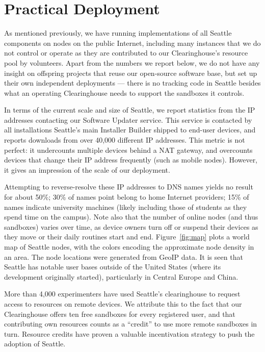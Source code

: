 \section{Practical Deployment}\label{sec-deployment}

As mentioned previously, we have running implementations of all
Seattle components on nodes on the public Internet, including
many instances that we do not control or operate as they are
contributed to our Clearinghouse's resource pool by volunteers.
Apart from the numbers we report below, we do not have any
insight on offspring projects that reuse our open-source software
base, but set up their own independent deployments --- there is
no tracking code in Seattle besides what an operating Clearinghouse
needs to support the sandboxes it controls.

In terms of the current scale and size of Seattle, we report
statistics from the \gls{IP} addresses contacting our Software
Updater service. This service is contacted
by all installations Seattle's main Installer Builder shipped
to end-user devices, and reports downloads from over 40,000
different \gls{IP} addresses.
This metric is not perfect: it undercounts multiple devices behind
a \gls{NAT} gateway, and overcounts devices that change their
\gls{IP} address frequently (such as mobile nodes). However, it
gives an impression of the scale of our deployment.

Attempting to reverse-resolve these \gls{IP} addresses to \gls{DNS}
names yields no result for about 50\%; 30\% of names point belong
to home Internet providers; 15\% of names indicate
university machines (likely including those of students as they
spend time on the campus). Note also that the number of online
nodes (and thus sandboxes) varies over time, as device owners
turn off or suspend their devices as they move or their daily
routines start and end.
Figure~\ref{fig:map} plots a world map of Seattle nodes, with the
colors encoding the approximate node density in an area.
The node locations were generated from GeoIP data.
It is seen that Seattle has notable user bases outside of the
United States (where its development originally started),
particularly in Central Europe and China.

More than 4,000 experimenters have used Seattle's clearinghouse
to request access to resources on remote devices. We attribute this
to the fact that our Clearinghouse offers ten free sandboxes for
every registered user, and that contributing own resources counts
as a ``credit'' to use more remote sandboxes in turn.
Resource credits have proven a valuable incentivation strategy
to push the adoption of Seattle.

